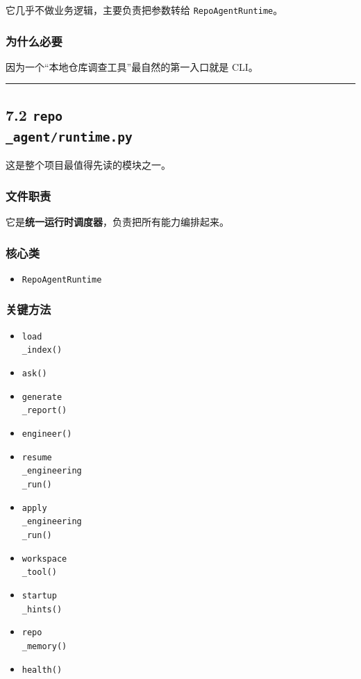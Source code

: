 \documentclass[UTF8,12pt,openany]{ctexbook}
\begin{document}
它几乎不做业务逻辑，主要负责把参数转给 \texttt{RepoAgentRuntime}。\par

\subsubsection{为什么必要}

因为一个“本地仓库调查工具”最自然的第一入口就是 CLI。\par

\hrule

\subsection{7.2 \texttt{repo\\_agent/runtime.py}}

这是整个项目最值得先读的模块之一。\par

\subsubsection{文件职责}

它是\textbf{统一运行时调度器}，负责把所有能力编排起来。\par

\subsubsection{核心类}

\begin{itemize}
\item \texttt{RepoAgentRuntime}
\end{itemize}

\subsubsection{关键方法}

\begin{itemize}
\item \texttt{load\\_index()}
\item \texttt{ask()}
\item \texttt{generate\\_report()}
\item \texttt{engineer()}
\item \texttt{resume\\_engineering\\_run()}
\item \texttt{apply\\_engineering\\_run()}
\item \texttt{workspace\\_tool()}
\item \texttt{startup\\_hints()}
\item \texttt{repo\\_memory()}
\item \texttt{health()}
\end{itemize}
\end{document}
